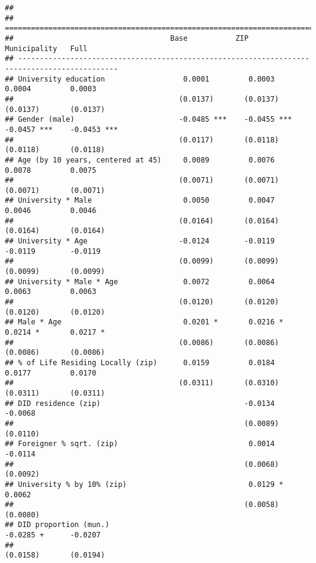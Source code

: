 \documentclass[
]{article}
\begin{document}
\begin{verbatim}
## 
## =============================================================================================
##                                    Base           ZIP            Municipality   Full         
## ---------------------------------------------------------------------------------------------
## University education                  0.0001         0.0003         0.0004         0.0003    
##                                      (0.0137)       (0.0137)       (0.0137)       (0.0137)   
## Gender (male)                        -0.0485 ***    -0.0455 ***    -0.0457 ***    -0.0453 ***
##                                      (0.0117)       (0.0118)       (0.0118)       (0.0118)   
## Age (by 10 years, centered at 45)     0.0089         0.0076         0.0078         0.0075    
##                                      (0.0071)       (0.0071)       (0.0071)       (0.0071)   
## University * Male                     0.0050         0.0047         0.0046         0.0046    
##                                      (0.0164)       (0.0164)       (0.0164)       (0.0164)   
## University * Age                     -0.0124        -0.0119        -0.0119        -0.0119    
##                                      (0.0099)       (0.0099)       (0.0099)       (0.0099)   
## University * Male * Age               0.0072         0.0064         0.0063         0.0063    
##                                      (0.0120)       (0.0120)       (0.0120)       (0.0120)   
## Male * Age                            0.0201 *       0.0216 *       0.0214 *       0.0217 *  
##                                      (0.0086)       (0.0086)       (0.0086)       (0.0086)   
## % of Life Residing Locally (zip)      0.0159         0.0184         0.0177         0.0170    
##                                      (0.0311)       (0.0310)       (0.0311)       (0.0311)   
## DID residence (zip)                                 -0.0134                       -0.0068    
##                                                     (0.0089)                      (0.0110)   
## Foreigner % sqrt. (zip)                              0.0014                       -0.0114    
##                                                     (0.0068)                      (0.0092)   
## University % by 10% (zip)                            0.0129 *                      0.0062    
##                                                     (0.0058)                      (0.0080)   
## DID proportion (mun.)                                              -0.0285 +      -0.0207    
##                                                                    (0.0158)       (0.0194)   

\end{verbatim}
\end{document}

